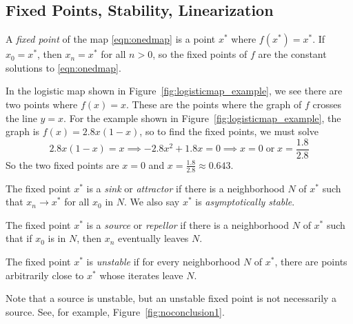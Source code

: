 %
\subsection*{Fixed Points, Stability, Linearization}
A \emph{fixed point} of the map \eqref{eqn:onedmap}
is a point $x^*$ where $f(x^*)=x^*$.
If $x_0=x^*$, then $x_n=x^*$ for all $n>0$, so the fixed points
of $f$ are the constant solutions to \eqref{eqn:onedmap}.

In the logistic map shown in Figure~\ref{fig:logisticmap_example},
we see there are two
points where $f(x)=x$.  These are the points
where the graph of $f$ crosses the line $y=x$.
For the example shown in Figure~\ref{fig:logisticmap_example},
the graph is $f(x) = 2.8x(1-x)$, so to find the fixed points,
we must solve
\begin{equation}
  2.8x(1-x) = x \implies -2.8x^2 + 1.8x = 0
  \implies x = 0 \;\textrm{or}\; x = \frac{1.8}{2.8}
\end{equation}
So the two fixed points are $x=0$ and $x=\frac{1.8}{2.8}\approx 0.643$.

\begin{definition}
The fixed point $x^*$ is a \emph{sink} or \emph{attractor}
if there is a neighborhood $N$ of $x^*$ such that
$x_n\rightarrow x^*$ for all $x_0$ in $N$.
We also say $x^*$ is \emph{asymptotically stable}.
\end{definition}
\begin{definition}
The fixed point $x^*$ is a \emph{source} or \emph{repellor}
if there is a neighborhood $N$ of $x^*$ such that if $x_0$
is in $N$, then $x_n$ eventually leaves $N$.
\end{definition}
\begin{definition}
The fixed point $x^*$ is \emph{unstable} if for every
neighborhood $N$ of $x^*$, there are points arbitrarily close
to $x^*$ whose iterates leave $N$.
\end{definition}

\vspace{0.2cm}
Note that a source is unstable, but an unstable fixed point
is not necessarily a source.  See, for example,
Figure~\ref{fig:noconclusion1}.






